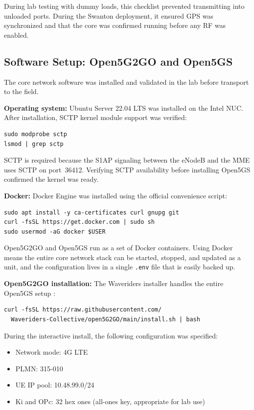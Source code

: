 \documentclass[
    left=1.5in,
    right=1.25in,
    top=1.25in,
    bottom=1.25in
]{CalPolySeniorProject}
\begin{document}
During lab testing with dummy loads, this checklist prevented transmitting into
unloaded ports. During the Swanton deployment, it ensured GPS was synchronized
and that the core was confirmed running before any RF was enabled.

\subsection{Software Setup: Open5G2GO and Open5GS}

The core network software was installed and validated in the lab before transport
to the field.

\textbf{Operating system:} Ubuntu Server 22.04 LTS was installed on the Intel
NUC. After installation, SCTP kernel module support was verified:

\begin{verbatim}
sudo modprobe sctp
lsmod | grep sctp
\end{verbatim}

SCTP is required because the S1AP signaling between the eNodeB and the MME uses
SCTP on port~36412. Verifying SCTP availability before installing Open5GS
confirmed the kernel was ready.

\textbf{Docker:} Docker Engine was installed using the official convenience
script:

\begin{verbatim}
sudo apt install -y ca-certificates curl gnupg git
curl -fsSL https://get.docker.com | sudo sh
sudo usermod -aG docker $USER
\end{verbatim}

Open5G2GO and Open5GS run as a set of Docker containers. Using Docker means the
entire core network stack can be started, stopped, and updated as a unit, and
the configuration lives in a single \texttt{.env} file that is easily backed up.

\textbf{Open5G2GO installation:} The Waveriders installer handles the entire
Open5GS setup \autocite{waveriders2025open5g2go}:

\begin{verbatim}
curl -fsSL https://raw.githubusercontent.com/
  Waveriders-Collective/open5G2GO/main/install.sh | bash
\end{verbatim}

During the interactive install, the following configuration was specified:

\begin{itemize}
    \item Network mode: 4G LTE
    \item PLMN: 315-010
    \item UE IP pool: 10.48.99.0/24
    \item Ki and OPc: 32 hex ones (all-ones key, appropriate for lab use)
\end{itemize}
\end{document}
